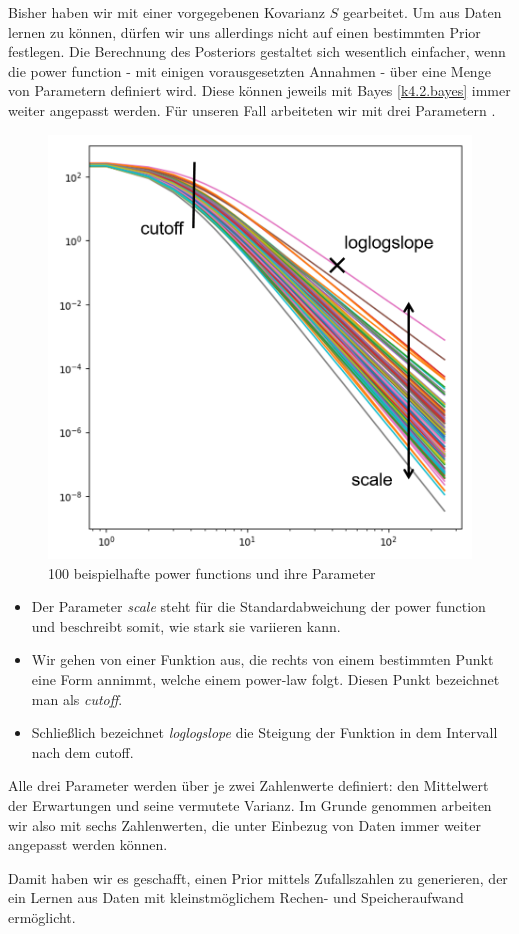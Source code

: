 Bisher haben wir mit einer vorgegebenen Kovarianz $S$ gearbeitet. Um aus Daten lernen zu können, dürfen wir uns allerdings nicht auf einen bestimmten Prior festlegen. Die Berechnung des Posteriors gestaltet sich wesentlich einfacher, wenn die power function - mit einigen vorausgesetzten Annahmen - über eine Menge von Parametern definiert wird. Diese können jeweils mit Bayes \cref{k4.2.bayes} immer weiter angepasst werden. Für unseren Fall arbeiteten wir mit drei Parametern %
.
\begin{figure}[h] 
    \centering
    \includegraphics{k4.2/power_function_bearbeitet.png}
    \caption{100 beispielhafte power functions und ihre Parameter}
\end{figure}
\begin{itemize}
    \item Der Parameter \emph{scale} steht für die Standardabweichung der power function und beschreibt somit, wie stark sie variieren kann.
    \item Wir gehen von einer Funktion aus, die rechts von einem bestimmten Punkt eine Form annimmt, welche einem power-law folgt. Diesen Punkt bezeichnet man als \emph{cutoff}.
    \item Schließlich bezeichnet \emph{loglogslope} die Steigung der Funktion in dem Intervall nach dem cutoff.
\end{itemize}
Alle drei Parameter werden über je zwei Zahlenwerte definiert: den Mittelwert der Erwartungen und seine vermutete Varianz. Im Grunde genommen arbeiten wir also mit sechs Zahlenwerten, die unter Einbezug von Daten immer weiter angepasst werden können.

Damit haben wir es geschafft, einen Prior mittels Zufallszahlen zu generieren, der ein Lernen aus Daten mit kleinstmöglichem Rechen- und Speicheraufwand ermöglicht.
